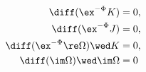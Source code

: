 \begin{equation}
\label{2G2cond}
\begin{aligned}
  \diff (\ex^{-\Phi} K) & = 0, \\
  \diff (\ex^{-\Phi} J) & = 0, \\
  \diff (\ex^{-\Phi}\re \Omega )\wed K & = 0,\\
  \diff (\im \Omega) \wed \im \Omega & = 0 
\end{aligned}
\end{equation}

